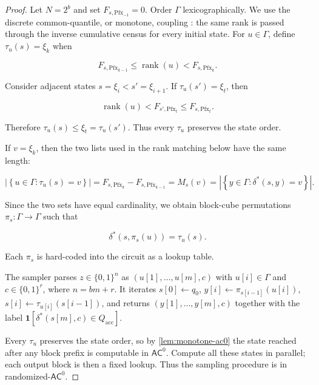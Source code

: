 \documentclass[10pt]{article}
\theoremstyle{definition}
\newcommand{\AC}{\mathsf{AC}}
\newcommand{\bits}{\{0,1\}}
\newcommand{\ind}{\mathbf{1}}
\begin{document}
\begin{proof}
Let $N=2^b$ and set $F_{s,\mathrm{Pfx}_{-1}}=0$.  Order $\Gamma$
lexicographically.  We use the discrete common-quantile, or monotone,
coupling \cite[Chapter~1, Section~3]{thorisson2000coupling}: the same rank is
passed through the inverse cumulative census for every initial state.  For
$u\in\Gamma$, define $\tau_u(s)=\xi_k$ when

\begin{equation}
 F_{s,\mathrm{Pfx}_{k-1}}
 \le\operatorname{rank}(u)<
 F_{s,\mathrm{Pfx}_k}.
\end{equation}

Consider adjacent states $s=\xi_i<s'=\xi_{i+1}$.  If $\tau_u(s')=\xi_t$,
then

\begin{equation}
 \operatorname{rank}(u)
 <F_{s',\mathrm{Pfx}_t}
 \le F_{s,\mathrm{Pfx}_t}.
\end{equation}

Therefore $\tau_u(s)\le\xi_t=\tau_u(s')$.  Thus every $\tau_u$ preserves the
state order.

If $v=\xi_k$, then the two lists used in the rank matching below have the same
length:

\begin{equation}
 \left|\left\{u\in\Gamma:\tau_u(s)=v\right\}\right|
 =F_{s,\mathrm{Pfx}_k}-F_{s,\mathrm{Pfx}_{k-1}}
 =M_s(v)
 =\left|\left\{y\in\Gamma:\delta^*(s,y)=v\right\}\right|.
\end{equation}

Since the two sets have equal cardinality, we obtain block-cube permutations
$\pi_s:\Gamma\to\Gamma$ such that

\begin{equation}
 \delta^*(s,\pi_s(u))=\tau_u(s).
\end{equation}

Each $\pi_s$ is hard-coded into the circuit as a lookup table.

The sampler parses $z\in\bits^n$ as
$(u[1],\ldots,u[m],c)$ with $u[i]\in\Gamma$ and $c\in\bits^r$, where
$n=bm+r$.  It iterates $s[0]\gets q_0$,
$y[i]\gets\pi_{s[i-1]}(u[i])$, $s[i]\gets\tau_{u[i]}(s[i-1])$, and returns
$(y[1],\ldots,y[m],c)$ together with the label
$\ind[\delta^*(s[m],c)\in Q_{\mathrm{acc}}]$.

Every $\tau_u$ preserves the state order, so by \cref{lem:monotone-ac0} the
state reached after any block prefix is computable in $\AC^0$.  Compute all
these states in parallel; each output block is then a fixed lookup.  Thus the
sampling procedure is in randomized-$\AC^0$.
\end{proof}
\end{document}
